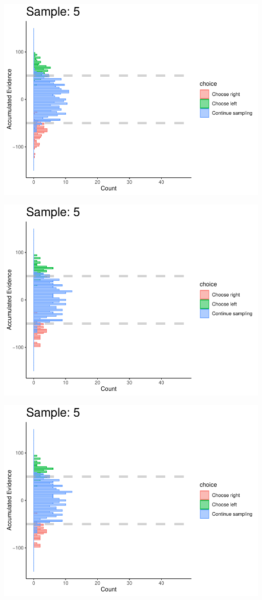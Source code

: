 \documentclass[
]{book}
\begin{document}
\begin{center}\includegraphics[width=0.8\linewidth]{LateNightBayes_files/figure-latex/fixed_check-40} \end{center}

\begin{center}\includegraphics[width=0.8\linewidth]{LateNightBayes_files/figure-latex/fixed_check-41} \end{center}

\begin{center}\includegraphics[width=0.8\linewidth]{LateNightBayes_files/figure-latex/fixed_check-42} \end{center}
\end{document}
